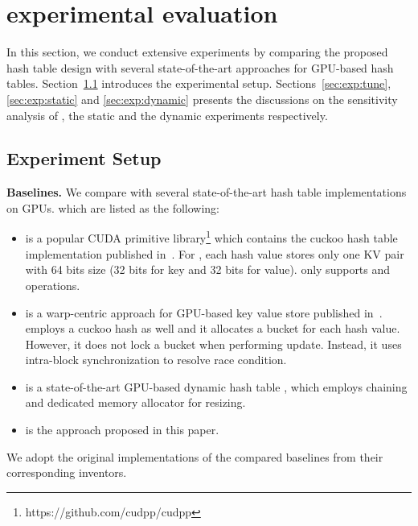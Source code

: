 \section{experimental evaluation}\label{sec:exp}
In this section, we conduct extensive experiments by comparing the proposed hash table design \voter with several state-of-the-art approaches for GPU-based hash tables. 
Section~\ref{sec:exp:setup} introduces the experimental setup. 
Sections~\ref{sec:exp:tune}, \ref{sec:exp:static} and \ref{sec:exp:dynamic} presents the discussions on the sensitivity analysis of \voter, the static and the dynamic experiments respectively.

\subsection{Experiment Setup}\label{sec:exp:setup}

\vspace{1mm}\noindent\textbf{Baselines.} We compare \voter with several state-of-the-art hash table implementations on GPUs. which are listed as the following:
\begin{itemize}
	\item \cudpp is a popular CUDA primitive library\footnote{https://github.com/cudpp/cudpp} which contains the cuckoo hash table implementation published in~\cite{alcantara2009real}. 
	For \cudpp, each hash value stores only one KV pair with 64 bits size (32 bits for key and 32 bits for value). 
	\cudpp only supports  and  operations. 
	\item \megakv is a warp-centric approach for GPU-based key value store published in~\cite{zhang2015mega}. \megakv employs a cuckoo hash as well and
	it allocates a bucket for each hash value. However, it does not lock a bucket when performing update. Instead, it uses intra-block synchronization to resolve race condition. 
	\item \slab is a state-of-the-art GPU-based dynamic hash table \cite{ashkiani2018dynamic}, which employs chaining and dedicated memory allocator for resizing.
	\item \voter is the approach proposed in this paper.
\end{itemize}
We adopt the original implementations of the compared baselines from their corresponding inventors. 

